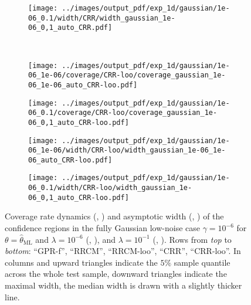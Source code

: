 \documentclass[10pt, conference, compsocconf]{IEEEtran}
\begin{document}
\begin{figure}
\begin{subfigure}[b]{0.25\linewidth}
  \end{subfigure}%
  \begin{subfigure}[b]{0.25\linewidth}
    \texttt{[image: ../images/output\_pdf/exp\_1d/gaussian/1e-06\_0.1/width/CRR/width\_gaussian\_1e-06\_0,1\_auto\_CRR.pdf]}
  \end{subfigure}\\
  \begin{subfigure}[b]{0.25\linewidth}
    \texttt{[image: ../images/output\_pdf/exp\_1d/gaussian/1e-06\_1e-06/coverage/CRR-loo/coverage\_gaussian\_1e-06\_1e-06\_auto\_CRR-loo.pdf]}
    \caption{} \label{fig:gaussian_1d_low_noise_c3}
  \end{subfigure}%
  \begin{subfigure}[b]{0.25\linewidth}
    \texttt{[image: ../images/output\_pdf/exp\_1d/gaussian/1e-06\_0.1/coverage/CRR-loo/coverage\_gaussian\_1e-06\_0,1\_auto\_CRR-loo.pdf]}
    \caption{} \label{fig:gaussian_1d_low_noise_c4}
  \end{subfigure}%
  \begin{subfigure}[b]{0.25\linewidth}
    \texttt{[image: ../images/output\_pdf/exp\_1d/gaussian/1e-06\_1e-06/width/CRR-loo/width\_gaussian\_1e-06\_1e-06\_auto\_CRR-loo.pdf]}
    \caption{} \label{fig:gaussian_1d_low_noise_width_c3}
  \end{subfigure}%
  \begin{subfigure}[b]{0.25\linewidth}
    \texttt{[image: ../images/output\_pdf/exp\_1d/gaussian/1e-06\_0.1/width/CRR-loo/width\_gaussian\_1e-06\_0,1\_auto\_CRR-loo.pdf]}
    \caption{} \label{fig:gaussian_1d_low_noise_width_c4}
  \end{subfigure}%
  \caption{Coverage rate dynamics (, )
  and asymptotic width (, )
  of the confidence regions in the fully Gaussian low-noise case $\gamma=10^{-6}$
  for $\theta=\hat{\theta}_\text{ML}$ and $\lambda = 10^{-6}$ (,
  ), and $\lambda = 10^{-1}$ (,
  ). Rows from \textit{top} to \textit{bottom}: ``GPR-f'', ``RRCM'',
  ``RRCM-loo'', ``CRR'', ``CRR-loo''. In columns  and
   upward triangles indicate the $5\%$ sample
  quantile across the whole test sample, downward triangles indicate the maximal width,
  the median width is drawn with a slightly thicker line.}
  \label{fig:gaussian_1d_low_noise}
\end{figure}
\end{document}
